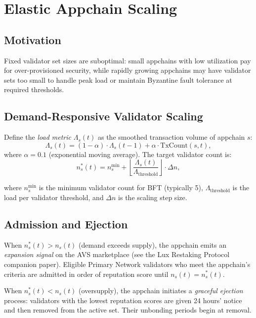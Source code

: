 \section{Elastic Appchain Scaling}

\label{sec:elastic}

\subsection{Motivation}

Fixed validator set sizes are suboptimal: small appchains with low utilization pay for
over-provisioned security, while rapidly growing appchains may have validator sets too
small to handle peak load or maintain Byzantine fault tolerance at required thresholds.

\subsection{Demand-Responsive Validator Scaling}

Define the \emph{load metric} $\Lambda_s(t)$ as the smoothed transaction volume of
appchain $s$:
\[
  \Lambda_s(t) = (1-\alpha) \cdot \Lambda_s(t-1) + \alpha \cdot \text{TxCount}(s, t),
\]
where $\alpha = 0.1$ (exponential moving average). The target validator count is:
\begin{equation}
  n_s^*(t) = n_s^{\min} + \left\lfloor \frac{\Lambda_s(t)}{\Lambda_{\text{threshold}}} \right\rfloor \cdot \Delta n,
  \label{eq:elastic}
\end{equation}

where $n_s^{\min}$ is the minimum validator count for BFT (typically 5), $\Lambda_{\text{threshold}}$
is the load per validator threshold, and $\Delta n$ is the scaling step size.

\subsection{Admission and Ejection}

When $n_s^*(t) > n_s(t)$ (demand exceeds supply), the appchain emits an \emph{expansion
signal} on the AVS marketplace (see the Lux Restaking Protocol companion paper).
Eligible Primary Network validators who meet the appchain's criteria are admitted in order
of reputation score until $n_s(t) = n_s^*(t)$.

When $n_s^*(t) < n_s(t)$ (oversupply), the appchain initiates a \emph{graceful ejection}
process: validators with the lowest reputation scores are given 24 hours' notice and
then removed from the active set. Their unbonding periods begin at removal.

